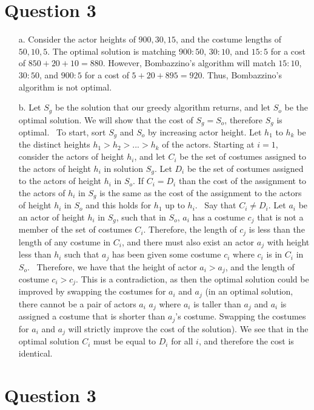 \documentclass[12pt]{article}
\begin{document}
\section*{Question 3} 
\begin{enumerate}
    \item[a.] Consider the actor heights of $900, 30, 15$, and the costume lengths of $50, 10, 5$. The optimal solution is matching $900 : 50$, $30 : 10$, and $15 : 5$ for a cost of $850 + 20 + 10 = 880$. However, Bombazzino's algorithm will match $15 : 10$, $30 : 50$, and $900 : 5$ for a cost of $5 + 20 + 895 = 920$. Thus, Bombazzino's algorithm is not optimal.
    \item[b.] Let $S_g$ be the solution that our greedy algorithm returns, and let $S_o$ be the optimal solution. We will show that the cost of $S_g = S_o$, therefore $S_g$ is optimal.
    \newline \,
    \newline
    To start, sort $S_g$ and $S_o$ by increasing actor height. Let $h_1$ to $h_k$ be the distinct heights $h_1 > h_2 > ... > h_k$ of the actors. Starting at $i = 1$, consider the actors of height $h_i$, and let $C_i$ be the set of costumes assigned to the actors of height $h_i$ in solution $S_g$. Let $D_i$ be the set of costumes assigned to the actors of height $h_i$ in $S_o$. If $C_i = D_i$ than the cost of the assignment to the actors of $h_i$ in $S_g$ is the same as the cost of the assignment to the actors of height $h_i$ in $S_o$ and this holds for $h_1$ up to $h_i$.
    \newline \,
    \newline
    Say that $C_i \neq D_i$. Let $a_i$ be an actor of height $h_i$ in $S_g$, such that in $S_o$, $a_i$ has a costume $c_j$ that is not a member of the set of costumes $C_i$. Therefore, the length of $c_j$ is less than the length of any costume in $C_i$, and there must also exist an actor $a_j$ with height less than $h_i$ such that $a_j$ has been given some costume $c_i$ where $c_i$ is in $C_i$ in $S_o$.
    \newline \,
    \newline
    Therefore, we have that the height of actor $a_i > a_j$, and the length of costume $c_i > c_j$. This is a contradiction, as then the optimal solution could be improved by swapping the costumes for $a_i$ and $a_j$ (in an optimal solution, there cannot be a pair of actors $a_i$ $a_j$ where $a_i$ is taller than $a_j$ and $a_i$ is assigned a costume that is shorter than $a_j$'s costume. Swapping the costumes for $a_i$ and $a_j$ will strictly improve the cost of the solution). We see that in the optimal solution $C_i$ must be equal to $D_i$ for all $i$, and therefore the cost is identical.

\end{enumerate}

\newpage
\section*{Question 3}
\end{document}

